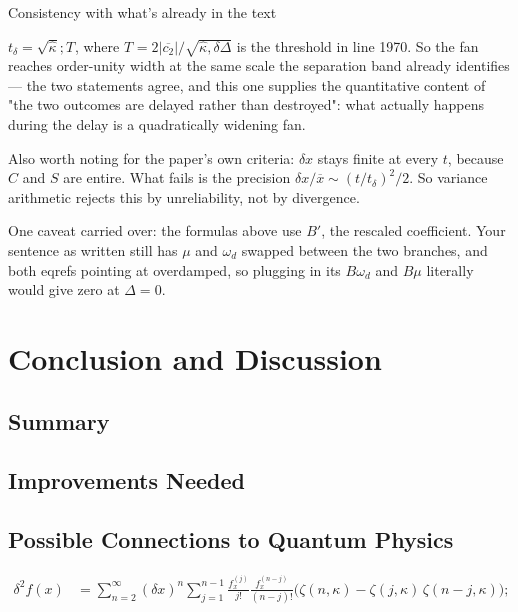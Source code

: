 \documentclass[twoside]{article}
\numberwithin{equation}{section}
\begin{document}
Consistency with what's already in the text

$t_\delta = \sqrt{\hat\kappa};T^{}$, where $T^{} = 2|\overline{c_2}|/\sqrt{\hat\kappa,\delta\Delta}$ is the threshold in line 1970. So the fan reaches order-unity width at the same scale the separation band already identifies — the two statements agree, and this one supplies the quantitative content of "the two outcomes are delayed rather than destroyed": what actually happens during the delay is a quadratically widening fan.

Also worth noting for the paper's own criteria: $\delta x$ stays finite at every $t$, because $C$ and $S$ are entire. What fails is the precision $\delta x/\overline{x} \sim (t/t_\delta)^2/2$. So variance arithmetic rejects this by unreliability, not by divergence.

One caveat carried over: the formulas above use $B'$, the rescaled coefficient. Your sentence as written still has $\mu$ and $\omega_d$ swapped between the two branches, and both eqrefs pointing at overdamped, so plugging in its $B\omega_d$ and $B\mu$ literally would give zero at $\Delta = 0$.



\section{Conclusion and Discussion}

\subsection{Summary}

\subsection{Improvements Needed}

\subsection{Possible Connections to Quantum Physics}

\begin{align}
\label{eqn: Taylor 1d variance}
\delta^2 f(x) &= \sum_{n=2}^{\infty} (\delta x)^n \sum_{j=1}^{n-1} \frac{f^{(j)}_x}{j!} \frac{f^{(n-j)}_x}{(n-j)!} \bigl( \zeta(n, \kappa) - \zeta(j, \kappa)\, \zeta(n-j, \kappa) \bigr);
\end{align}
\end{document}
